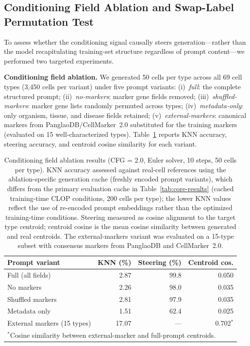 \documentclass[genes,article,submit,pdftex,oneauthor]{Definitions/mdpi}
\begin{document}
\subsection{Conditioning Field Ablation and Swap-Label Permutation Test}\label{sec:cond-ablation}

To assess whether the conditioning signal causally steers generation---rather than the model recapitulating training-set structure regardless of prompt content---we performed two targeted experiments.

\textbf{Conditioning field ablation.} We generated 50 cells per type across all 69 cell types (3{,}450 cells per variant) under five prompt variants: (i)~\emph{full}: the complete structured prompt; (ii)~\emph{no-markers}: marker gene fields removed; (iii)~\emph{shuffled-markers}: marker gene lists randomly permuted across types; (iv)~\emph{metadata-only}: only organism, tissue, and disease fields retained; (v)~\emph{external-markers}: canonical markers from PanglaoDB/CellMarker~2.0 substituted for the training markers (evaluated on 15 well-characterized types). Table~\ref{tab:cond-ablation} reports KNN accuracy, steering accuracy, and centroid cosine similarity for each variant.

\begin{table}[!htbp]
\centering
\caption{Conditioning field ablation results (CFG = 2.0, Euler solver, 10 steps, 50 cells per type). KNN accuracy assessed against real-cell references using the ablation-specific generation cache (freshly encoded prompt variants), which differs from the primary evaluation cache in Table~\ref{tab:core-results} (cached training-time CLOP conditions, 200 cells per type); the lower KNN values reflect the use of re-encoded prompt embeddings rather than the optimized training-time conditions. Steering measured as cosine alignment to the target type centroid; centroid cosine is the mean cosine similarity between generated and real centroids. The external-markers variant was evaluated on a 15-type subset with consensus markers from PanglaoDB and CellMarker~2.0.\label{tab:cond-ablation}}
\begin{tabular}{lrrr}
\toprule
Prompt variant & KNN (\%) & Steering (\%) & Centroid cos. \\
\midrule
Full (all fields) & 2.87 & 99.8 & 0.050 \\
No markers & 2.26 & 98.0 & 0.035 \\
Shuffled markers & 2.81 & 97.9 & 0.035 \\
Metadata only & 1.51 & 62.4 & 0.025 \\
External markers (15 types) & 17.07 & --- & 0.702$^*$ \\
\bottomrule
\multicolumn{4}{l}{\footnotesize $^*$Cosine similarity between external-marker and full-prompt centroids.}
\end{tabular}
\end{table}
\end{document}
